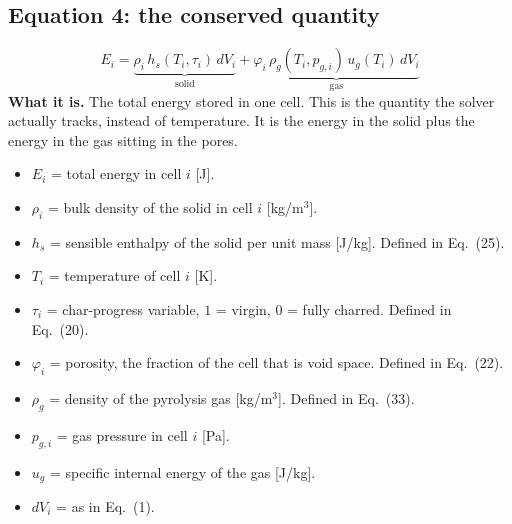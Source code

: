 \documentclass[11pt]{article}
\begin{document}
\subsection*{Equation 4: the conserved quantity}
\begin{equation}
E_i = \underbrace{\rho_i\, h_s(T_i, \tau_i)\, dV_i}_{\text{solid}}
    + \underbrace{\varphi_i\, \rho_g(T_i, p_{g,i})\, u_g(T_i)\, dV_i}_{\text{gas}}
\end{equation}
\textbf{What it is.} The total energy stored in one cell. This is the quantity
the solver actually tracks, instead of temperature. It is the energy in the solid
plus the energy in the gas sitting in the pores.
\begin{itemize}
  \item $E_i$ = total energy in cell $i$ [J].
  \item $\rho_i$ = bulk density of the solid in cell $i$ [kg/m$^3$].
  \item $h_s$ = sensible enthalpy of the solid per unit mass [J/kg]. Defined in
        Eq.~(25).
  \item $T_i$ = temperature of cell $i$ [K].
  \item $\tau_i$ = char-progress variable, $1$ = virgin, $0$ = fully charred.
        Defined in Eq.~(20).
  \item $\varphi_i$ = porosity, the fraction of the cell that is void space.
        Defined in Eq.~(22).
  \item $\rho_g$ = density of the pyrolysis gas [kg/m$^3$]. Defined in Eq.~(33).
  \item $p_{g,i}$ = gas pressure in cell $i$ [Pa].
  \item $u_g$ = specific internal energy of the gas [J/kg].
  \item $dV_i$ = as in Eq.~(1).
\end{itemize}
\end{document}
